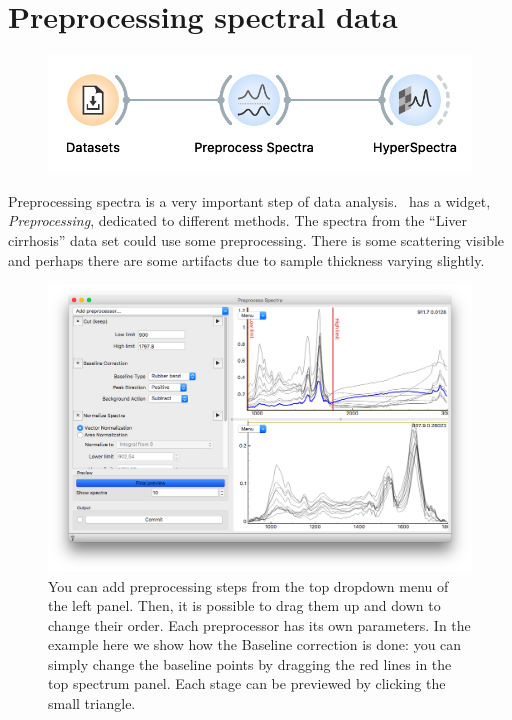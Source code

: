 \chapter{Preprocessing spectral data}
\label{ch:spectral_preprocessing}


\begin{figure}
    \centering
    \vspace{-3.4cm}
    \includegraphics[scale=0.55]{graphics/ch-spectral_preprocessing/spectral_preprocessing-fig1.png}
    \label{fig:spectral_preprocessing-fig1}
\end{figure}

Preprocessing spectra is a very important step of data analysis. \mutation\ has a widget, \textit{Preprocessing}, dedicated to different methods. The spectra from the ``Liver cirrhosis'' data set could use some preprocessing. There is some scattering visible and perhaps there are some artifacts due to sample thickness varying slightly.

\begin{figure}[h]
    \vspace{-0.2cm}
    \includegraphics[scale=0.28]{graphics/ch-spectral_preprocessing/spectral_preprocessing-fig2.png}
    \caption{You can add preprocessing steps from the top dropdown menu of the left panel. Then, it is possible to drag them up and down to change their order. Each preprocessor has its own parameters. In the example here we show how the Baseline correction is done: you can simply change the baseline points by dragging the red lines in the top spectrum panel. Each stage can be previewed by clicking the small triangle.}
    \label{fig:spectral_preprocessing-fig2}
\end{figure}

